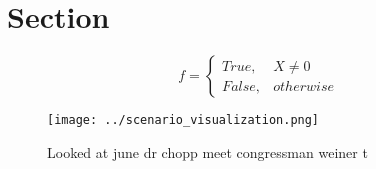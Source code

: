 \documentclass[a4paper]{article}
\begin{document}
\section{Section}

\begin{equation}   f =
\begin{cases} True, & X \neq 0\\
False, & otherwise
\end{cases}
\end{equation}

\begin{figure}
\centering
\texttt{[image: ../scenario\_visualization.png]}
\caption{Looked at june dr chopp meet congressman weiner t
}
\end{figure}
 
\end{document}
